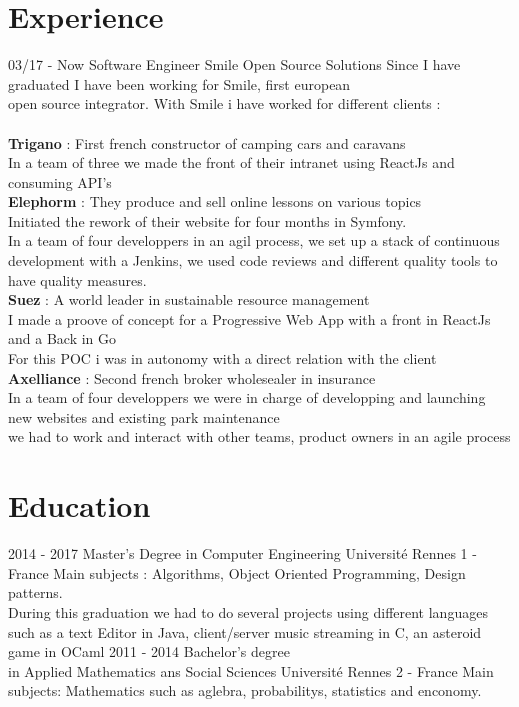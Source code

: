 \documentclass{friggeri-cv}
\begin{document}
\section{Experience}
\begin{entrylist}
	\entry
	{03/17 - Now}
	{Software Engineer}
	{Smile Open Source Solutions}
	{
		Since I have graduated I have been working for Smile, first european  \\ open source integrator.
		With Smile i have worked for different clients : \\
		\\
		\textbf{Trigano} : First french constructor of camping cars and caravans \\
			In a team of three we made the front of their intranet using ReactJs and consuming API's \\
		\textbf{Elephorm} : They produce and sell online lessons on various topics \\ 
			Initiated the rework of their website for four months in Symfony. \\
			In a team of four developpers in an agil process, we set up a stack of continuous development with a Jenkins, we used code reviews and different quality tools to have quality measures. \\
		\textbf{Suez} : A world leader in sustainable resource management \\
				I made a proove of concept for a Progressive Web App with a front in ReactJs and a Back in Go \\
				For this POC i was in autonomy {with a direct relation with the client} \\
		\textbf{Axelliance} : Second french broker wholesealer in insurance \\
			In a team of four developpers we were in charge of developping and launching new websites and existing park maintenance \\
			we had to work and interact with other teams, product owners in an agile process 
	}
\end{entrylist}

\section{Education}
\begin{entrylist}
	\entry
	{2014 - 2017}
	{Master's Degree in Computer Engineering}
	{Université Rennes 1 - France}
	{Main subjects : Algorithms, Object Oriented Programming, Design patterns. \\
	During this graduation we had to do several projects using different languages 
	such as a text Editor in Java, client/server music streaming in C, an asteroid game in OCaml
	}
	\entry
	{2011 - 2014}
	{Bachelor's degree \\in Applied Mathematics ans Social Sciences }
	{Université Rennes 2 - France}
	{Main subjects: Mathematics such as aglebra, probabilitys, statistics and enconomy.}
\end{entrylist}
\end{document}
